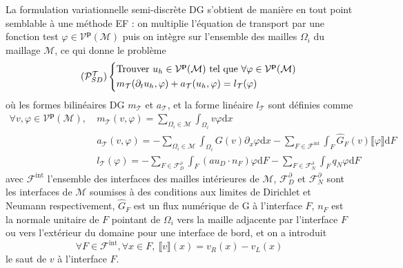 \documentclass[11pt, a4paper, oneside]{report}
\begin{document}
La formulation variationnelle semi-discrète DG s'obtient de manière en tout point semblable à une méthode EF : on multiplie l'équation de transport par une fonction test $\varphi \in \mathcal{V}^{\mathbf{p}}(\mathcal{M})$ puis on intègre sur l'ensemble des mailles $\Omega_i$ du maillage $\mathcal{M}$, ce qui donne le problème
\begin{equation} \tag{$\mathcal{P}_{SD}^\mathcal{T}$} \label{eq:Probleme_variationnel_transport}
    \left \{
    \begin{aligned}
        &\text{Trouver } u_h \in \mathcal{V}^{\mathbf{p}}(\mathcal{M}) \text{ tel que } \forall \varphi \in \mathcal{V}^{\mathbf{p}}(\mathcal{M}) \\
        &m_\mathcal{T}(\partial_t u_h, \varphi) + a_\mathcal{T}(u_h, \varphi) = l_\mathcal{T}(\varphi) 
    \end{aligned}
    \right .
\end{equation}
où les formes bilinéaires DG $m_\mathcal{T}$ et $a_\mathcal{T}$, et la forme linéaire $l_\mathcal{T}$ sont définies comme
\begin{equation}
    \begin{aligned}
        \forall v, \varphi \in \mathcal{V}^{\mathbf{p}}(\mathcal{M}), ~ & m_\mathcal{T}(v, \varphi) = \sum_{\Omega_i \in \mathcal{M}} \int_{\Omega_i} v \varphi \text{d}x \\
        & a_\mathcal{T}(v, \varphi) = - \sum_{\Omega_i \in \mathcal{M}} \int_{\Omega_i} G(v) \partial_x \varphi \text{d}x - \sum_{F \in \mathcal{F}^\text{int}} \int_F \widehat{G}_F(v) \llbracket \varphi \rrbracket \text{d}F \\
        & l_\mathcal{T}(\varphi) = - \sum_{F \in \mathcal{F}_D^\partial} \int_F (a u_D \cdot n_F) \varphi \text{d}F - \sum_{F \in \mathcal{F}_N^\partial} \int_F q_N \varphi \text{d}F
    \end{aligned}
\end{equation}
avec $\mathcal{F}^\text{int}$ l'ensemble des interfaces des mailles intérieures de $\mathcal{M}$, $\mathcal{F}_D^\partial$ et $\mathcal{F}_N^\partial$ sont les interfaces de $\mathcal{M}$ soumises à des conditions aux limites de Dirichlet et Neumann respectivement, $\widehat{G}_F$ est un flux numérique de G à l'interface $F$, $n_F$ est la normale unitaire de $F$ pointant de $\Omega_i$ vers la maille adjacente par l'interface $F$ ou vers l'extérieur du domaine pour une interface de bord, et on a introduit
\begin{equation}
    \forall F \in \mathcal{F}^\text{int}, \forall x \in F, ~ \llbracket v \rrbracket(x) = v_R(x) - v_L (x)
\end{equation}
le saut de $v$ à l'interface $F$. \\
\end{document}
